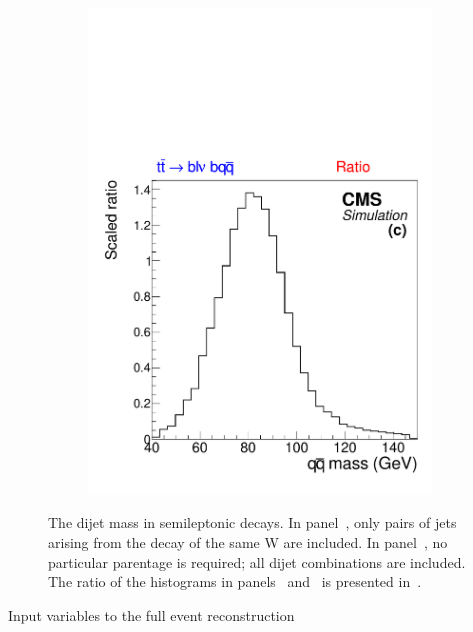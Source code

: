 \begin{figure}[tb]
\begin{subfigure}{0.33\textwidth}
    \includegraphics[width=\textwidth]{figures/dijet-ratio}
    \caption{}
    \label{sfig:ratio}
  \end{subfigure}%
  \caption[Dijet mass, for matched versus all possible dijet combinations]{
    The dijet mass in semileptonic \ttbar decays. In panel~,
    only pairs of jets arising from the decay of the same W are included. In
    panel~, no particular parentage is required; all dijet
    combinations are included. The ratio of the histograms in
    panels~ and~ is presented
    in~.
  }
  \label{fig:match-ratio}
\end{figure}

\begin{table}
  \caption{Input variables to the full event reconstruction}
  
  \label{tab:event-reco-match-vars}
\end{table}

